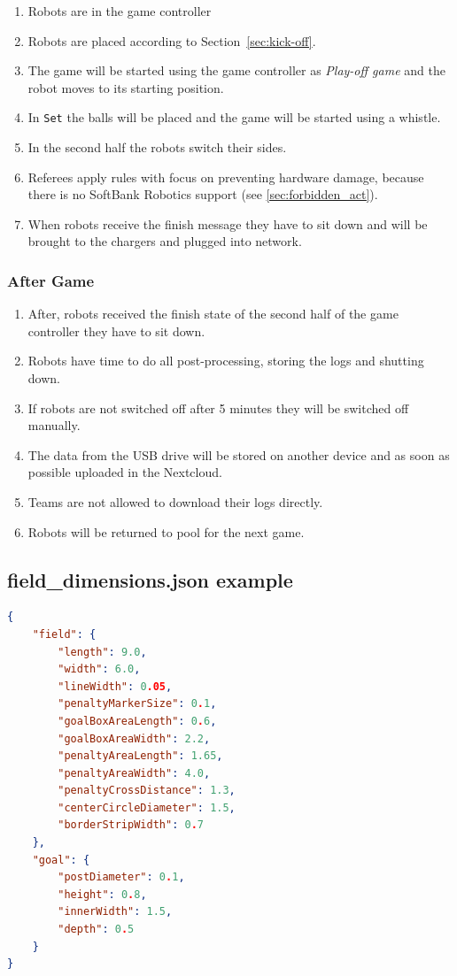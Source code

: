 	\begin{enumerate}
		\item Robots are in the game controller
		\item Robots are placed according to Section~\ref{sec:kick-off}.
		\item The game will be started using the game controller as \textit{Play-off game} and the robot moves to its starting position.
		\item In \texttt{Set} the balls will be placed and the game will be started using a whistle.
		\item In the second half the robots switch their sides.
		\item Referees apply rules with focus on preventing hardware damage, because there is no SoftBank Robotics support (see \ref{sec:forbidden_act}).
		\item When robots receive the finish message they have to sit down and will be brought to the chargers and plugged into network.
	\end{enumerate}
	
\subsubsection{After Game}
	
	\begin{enumerate}
		\item After, robots received the finish state of the second half of the game controller they have to sit down.
		\item Robots have time to do all post-processing, storing the logs and shutting down.
		\item If robots are not switched off after 5 minutes they will be switched off manually.
		\item The data from the USB drive will be stored on another device and as soon as possible uploaded in the Nextcloud.
		\item Teams are not allowed to download their logs directly.
		\item Robots will be returned to pool for the next game.
	\end{enumerate}

\subsection{field\_dimensions.json example}
\label{sec:fielddimensionsjson}

\begin{lstlisting}[language=json,firstnumber=1]
{
    "field": {
        "length": 9.0,
        "width": 6.0,
        "lineWidth": 0.05,
        "penaltyMarkerSize": 0.1,
        "goalBoxAreaLength": 0.6,
        "goalBoxAreaWidth": 2.2,
        "penaltyAreaLength": 1.65,
        "penaltyAreaWidth": 4.0,
        "penaltyCrossDistance": 1.3,
        "centerCircleDiameter": 1.5,
        "borderStripWidth": 0.7
    },
    "goal": {
        "postDiameter": 0.1,
        "height": 0.8,
        "innerWidth": 1.5,
        "depth": 0.5
    }
}
\end{lstlisting}


